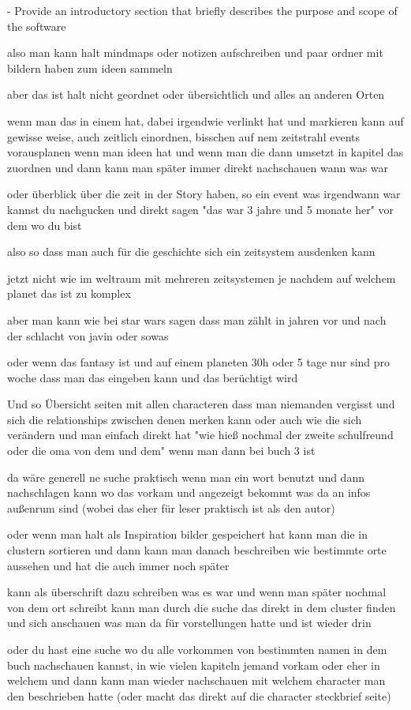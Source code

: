 
   
   
   
   - Provide an introductory section that briefly describes the purpose and scope of the software

also man kann halt mindmaps oder notizen aufschreiben und paar ordner mit bildern haben zum ideen sammeln

aber das ist halt nicht geordnet oder übersichtlich und alles an anderen Orten

wenn man das in einem hat, dabei irgendwie verlinkt hat und markieren kann auf gewisse weise, auch zeitlich einordnen, bisschen auf nem zeitstrahl events vorausplanen wenn man ideen hat und wenn man die dann umsetzt in kapitel das zuordnen und dann kann man später immer direkt nachschauen wann was war

oder überblick über die zeit in der Story haben, so ein event was irgendwann war kannst du nachgucken und direkt sagen "das war 3 jahre und 5 monate her" vor dem wo du bist

also so dass man auch für die geschichte sich ein zeitsystem ausdenken kann

jetzt nicht wie im weltraum mit mehreren zeitsystemen je nachdem auf welchem planet das ist zu komplex

aber man kann wie bei star wars sagen dass man zählt in jahren vor und nach der schlacht von javin oder sowas

oder wenn das fantasy ist und auf einem planeten 30h oder 5 tage nur sind pro woche dass man das eingeben kann und das berüchtigt wird

Und so Übersicht seiten mit allen characteren dass man niemanden vergisst und sich die relationships zwischen denen merken kann oder auch wie die sich verändern und man einfach direkt hat "wie hieß nochmal der zweite schulfreund oder die oma von dem und dem" wenn man dann bei buch 3 ist

da wäre generell ne suche praktisch wenn man ein wort benutzt und dann nachschlagen kann wo das vorkam und angezeigt bekommt was da an infos außenrum sind (wobei das eher für leser praktisch ist als den autor)

oder wenn man halt als Inspiration bilder gespeichert hat kann man die in clustern sortieren und dann kann man danach beschreiben wie bestimmte orte aussehen und hat die auch immer noch später

kann als überschrift dazu schreiben was es war und wenn man später nochmal von dem ort schreibt kann man durch die suche das direkt in dem cluster finden und sich anschauen was man da für vorstellungen hatte und ist wieder drin

oder du hast eine suche wo du alle vorkommen von bestimmten namen in dem buch nachschauen kannst, in wie vielen kapiteln jemand vorkam oder eher in welchem und dann kann man wieder nachschauen mit welchem character man den beschrieben hatte (oder macht das direkt auf die character steckbrief seite)